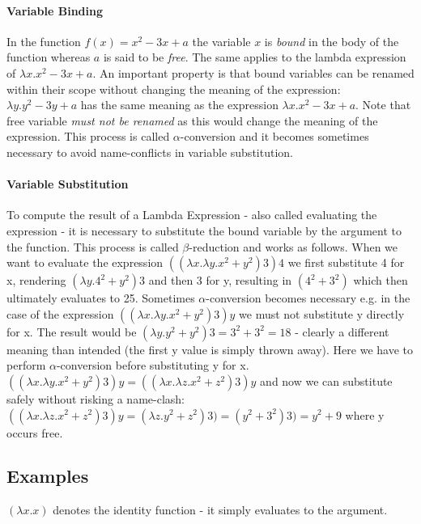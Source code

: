 \paragraph{Variable Binding}
In the function $f(x) = x^2 - 3x + a$ the variable $x$ is \textit{bound} in the body of the function whereas $a$ is said to be \textit{free}. The same applies to the lambda expression of $\lambda x.x^2 - 3x + a$. An important property is that bound variables can be renamed within their scope without changing the meaning of the expression: $\lambda y.y^2 - 3y + a$ has the same meaning as the expression $\lambda x.x^2 - 3x + a$. Note that free variable \textit{must not be renamed} as this would change the meaning of the expression. This process is called $\alpha$-conversion and it becomes sometimes necessary to avoid name-conflicts in variable substitution.

\paragraph{Variable Substitution}
To compute the result of a Lambda Expression - also called evaluating the expression - it is necessary to substitute the bound variable by the argument to the function. This process is called $\beta$-reduction and works as follows. When we want to evaluate the expression $((\lambda x.\lambda y.x^2 + y^2) 3) 4$ we first substitute 4 for x, rendering $(\lambda y.4^2 + y^2) 3$ and then 3 for y, resulting in $(4^2 + 3^2)$ which then ultimately evaluates to 25. Sometimes $\alpha$-conversion becomes necessary e.g. in the case of the expression $((\lambda x.\lambda y.x^2 + y^2) 3) y$ we must not substitute y directly for x. The result would be $(\lambda y.y^2 + y^2) 3 = 3^2 + 3^2 = 18$ - clearly a different meaning than intended (the first y value is simply thrown away). Here we have to perform $\alpha$-conversion before substituting y for x. \\ 
$((\lambda x.\lambda y.x^2 + y^2) 3) y = ((\lambda x.\lambda z.x^2 + z^2) 3) y$ and now we can substitute safely without risking a name-clash: $((\lambda x.\lambda z.x^2 + z^2) 3) y = (\lambda z.y^2 + z^2) 3) = (y^2 + 3^2) 3) = y^2 + 9$ where y occurs free.

\subsection*{Examples}
$(\lambda x.x)$ denotes the identity function - it simply evaluates to the argument. 

\medskip

